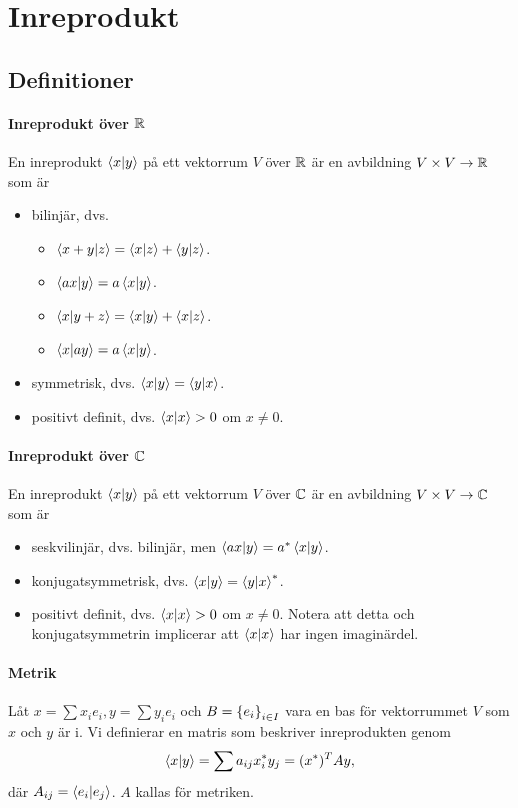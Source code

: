 \section{Inreprodukt}

\subsection{Definitioner}

\paragraph{Inreprodukt över $\mathbb{R}$}
En inreprodukt $\bra{x}\ket{y}$ på ett vektorrum $V$ över $\mathbb{R}$ är en avbildning $V\times V\to \mathbb{R}$ som är
\begin{itemize}
	\item bilinjär, dvs.
	\begin{itemize}
		\item $\bra{x + y}\ket{z} = \bra{x}\ket{z} + \bra{y}\ket{z}$.
		\item $\bra{ax}\ket{y} = a\bra{x}\ket{y}$.
		\item $\bra{x}\ket{y + z} = \bra{x}\ket{y} + \bra{x}\ket{z}$.
		\item $\bra{x}\ket{ay} = a\bra{x}\ket{y}$.
	\end{itemize}
	\item symmetrisk, dvs. $\bra{x}\ket{y} = \bra{y}\ket{x}$.
	\item positivt definit, dvs. $\bra{x}\ket{x} > 0$ om $x \neq 0$.
\end{itemize}

\paragraph{Inreprodukt över $\mathbb{C}$}
En inreprodukt $\bra{x}\ket{y}$ på ett vektorrum $V$ över $\mathbb{C}$ är en avbildning $V\times V\to \mathbb{C}$ som är
\begin{itemize}
	\item seskvilinjär, dvs. bilinjär, men $\bra{ax}\ket{y} = a^{*}\bra{x}\ket{y}$.
	\item konjugatsymmetrisk, dvs. $\bra{x}\ket{y} = \bra{y}\ket{x}^{*}$.
	\item positivt definit, dvs. $\bra{x}\ket{x} > 0$ om $x \neq 0$. Notera att detta och konjugatsymmetrin implicerar att $\bra{x}\ket{x}$ har ingen imaginärdel.
\end{itemize}

\paragraph{Metrik}
Låt $x = \sum x_{i}e_{i}, y = \sum y_{i}e_{i}$ och $B = \set{e_{i}}{}_{i\in I}$ vara en bas för vektorrummet $V$ som $x$ och $y$ är i. Vi definierar en matris som beskriver inreprodukten genom
\begin{align*}
	\bra{x}\ket{y} = \sum a_{ij}x_{i}^{*}y_{j} = (x^{*})^{T}Ay,
\end{align*}
där $A_{ij} = \bra{e_{i}}\ket{e_{j}}$. $A$ kallas för metriken.

